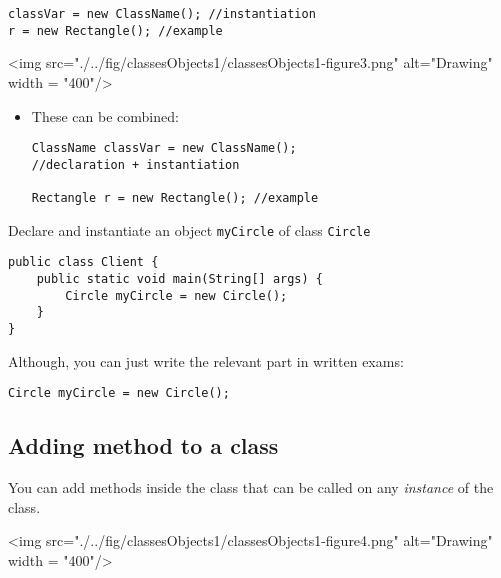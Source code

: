 \begin{lstlisting}[basicstyle=\small]
classVar = new ClassName(); //instantiation
r = new Rectangle(); //example
\end{lstlisting}

\vskip 0.5cm
\begin{center}
<img src="./../fig/classesObjects1/classesObjects1-figure3.png" alt="Drawing" width = "400"/> 
\end{center}


  \begin{itemize}
  \item These can be combined:
\begin{lstlisting}[basicstyle=\small]
ClassName classVar = new ClassName(); 
//declaration + instantiation

Rectangle r = new Rectangle(); //example
\end{lstlisting}
  \end{itemize}

\begin{exercise}
Declare and instantiate an object \texttt{myCircle} of class \texttt{Circle}
\end{exercise}
\begin{answer}
\begin{lstlisting}
public class Client {
	public static void main(String[] args) {
		Circle myCircle = new Circle();
	}
}
\end{lstlisting}	
Although, you can just write the relevant part in written exams:
\begin{lstlisting}
Circle myCircle = new Circle();
\end{lstlisting}
\end{answer}

\subsection{Adding method to a class}

You can add methods inside the class that can be called on any \textit{instance} of the class.



\vskip 0.1cm
\begin{center}
	<img src="./../fig/classesObjects1/classesObjects1-figure4.png" alt="Drawing" width = "400"/> 				
\end{center}
\vskip 0.1cm

